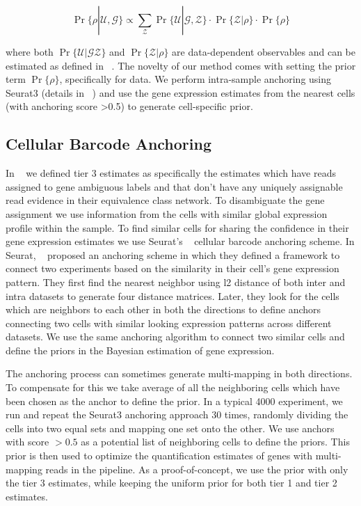 \begin{equation}
    \Pr \{ \rho | \mathcal{U}, \mathcal{G} \} 
    \propto \sum_{\mathcal{Z}} \Pr\{ \mathcal{U} | \mathcal{G}, \mathcal{Z} \}
    \cdot \Pr\{ \mathcal{Z} | \rho \} \cdot \Pr\{ \rho \}
\end{equation}

where both $\Pr\{ \mathcal{U} | \mathcal{G} \mathcal{Z} \}$ and $\Pr\{ \mathcal{Z} | \rho \}$ are 
data-dependent observables and can be estimated as defined in ~\citet{salmon}. The novelty of our method
comes with setting the prior term $\Pr\{ \rho \}$, specifically for \dscrnaseq data. We perform
intra-sample anchoring using Seurat3 (details in ~) and use the gene expression
estimates from the nearest cells (with anchoring score >0.5) to generate cell-specific prior.

\subsection{Cellular Barcode Anchoring}
\label{subsec:anchor}
In ~ we defined tier 3 estimates as specifically the estimates which have reads assigned 
to gene ambiguous labels and that don't have any uniquely assignable read evidence in their equivalence 
class network. To disambiguate the gene assignment we use 
information from the cells with similar global expression profile within the sample. To find similar cells for sharing 
the confidence in their gene expression estimates we use Seurat's ~\citep{seurat3} cellular
barcode anchoring scheme. In Seurat, ~\citet{seurat3} proposed an anchoring scheme in which they 
defined a framework to connect two experiments based on the similarity in their cell's gene expression 
pattern. They first find the nearest neighbor using l2 distance of both inter and intra datasets to generate 
four distance matrices. Later, they look for the cells which are neighbors to each other in both 
the directions to define anchors connecting two cells with similar looking expression patterns 
across different \singlecell datasets. We use the same anchoring algorithm to connect two similar 
cells and define the priors in the Bayesian estimation of gene expression.

The anchoring process can sometimes generate multi-mapping in both directions. To compensate for this we take 
average of all the neighboring cells which have been chosen as the anchor to define the prior. In a typical 4000 \singlecell 
experiment, we run \alevin and repeat the Seurat3 anchoring approach $30$ times, randomly dividing 
the cells into two equal sets and mapping one set onto the other. We use anchors with score $>0.5$ as a potential list 
of neighboring cells to define the priors. This prior is then used to optimize the quantification estimates of genes with multi-mapping reads in the \alevin pipeline. As a proof-of-concept, we use the prior with only the tier 3 
estimates, while keeping the uniform prior for both tier 1 and tier 2 estimates.

